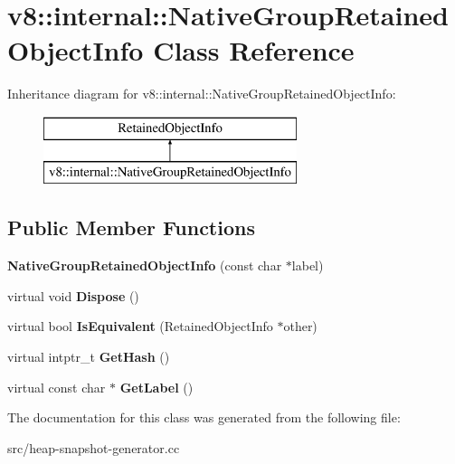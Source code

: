 \hypertarget{classv8_1_1internal_1_1_native_group_retained_object_info}{}\section{v8\+:\+:internal\+:\+:Native\+Group\+Retained\+Object\+Info Class Reference}
\label{classv8_1_1internal_1_1_native_group_retained_object_info}
Inheritance diagram for v8\+:\+:internal\+:\+:Native\+Group\+Retained\+Object\+Info\+:\begin{figure}[H]
\begin{center}
\leavevmode
\includegraphics[height=2.000000cm]{classv8_1_1internal_1_1_native_group_retained_object_info}
\end{center}
\end{figure}
\subsection*{Public Member Functions}
\begin{DoxyCompactItemize}
\item 
\hypertarget{classv8_1_1internal_1_1_native_group_retained_object_info_ac0426b5022da76fc2a5229ae7967c99a}{}{\bfseries Native\+Group\+Retained\+Object\+Info} (const char $\ast$label)\label{classv8_1_1internal_1_1_native_group_retained_object_info_ac0426b5022da76fc2a5229ae7967c99a}

\item 
\hypertarget{classv8_1_1internal_1_1_native_group_retained_object_info_aaea81e04752da6a0e273b5349e40c2d8}{}virtual void {\bfseries Dispose} ()\label{classv8_1_1internal_1_1_native_group_retained_object_info_aaea81e04752da6a0e273b5349e40c2d8}

\item 
\hypertarget{classv8_1_1internal_1_1_native_group_retained_object_info_a6c6bbdecc0a199cd5a79520161d02a1f}{}virtual bool {\bfseries Is\+Equivalent} (Retained\+Object\+Info $\ast$other)\label{classv8_1_1internal_1_1_native_group_retained_object_info_a6c6bbdecc0a199cd5a79520161d02a1f}

\item 
\hypertarget{classv8_1_1internal_1_1_native_group_retained_object_info_a27593c16a13464c40f097f1bfaddcc66}{}virtual intptr\+\_\+t {\bfseries Get\+Hash} ()\label{classv8_1_1internal_1_1_native_group_retained_object_info_a27593c16a13464c40f097f1bfaddcc66}

\item 
\hypertarget{classv8_1_1internal_1_1_native_group_retained_object_info_a794dc2fa2541c4786953f567ea1d1990}{}virtual const char $\ast$ {\bfseries Get\+Label} ()\label{classv8_1_1internal_1_1_native_group_retained_object_info_a794dc2fa2541c4786953f567ea1d1990}

\end{DoxyCompactItemize}


The documentation for this class was generated from the following file\+:\begin{DoxyCompactItemize}
\item 
src/heap-\/snapshot-\/generator.\+cc\end{DoxyCompactItemize}

